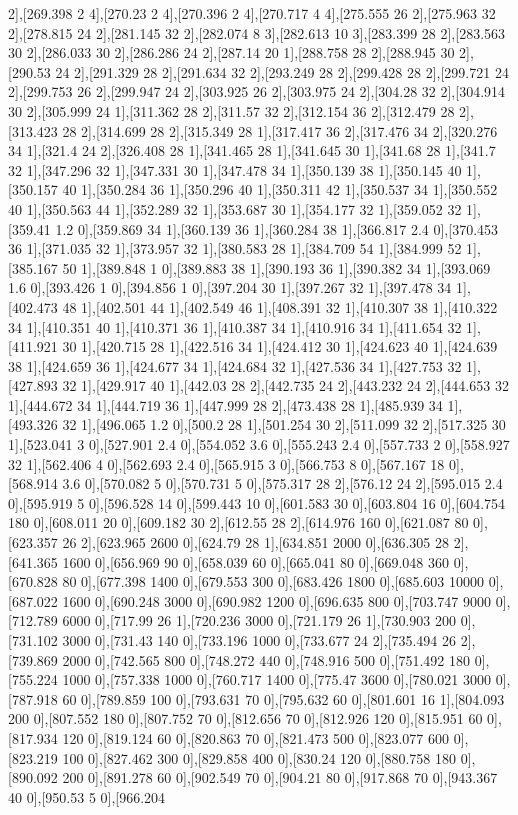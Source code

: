 {2],[269.398 2 4],[270.23 2 4],[270.396 2 4],[270.717 4 4],[275.555 26 2],[275.963 32 2],[278.815 24 2],[281.145 32 2],[282.074 8 3],[282.613 10 3],[283.399 28 2],[283.563 30 2],[286.033 30 2],[286.286 24 2],[287.14 20 1],[288.758 28 2],[288.945 30 2],[290.53 24 2],[291.329 28 2],[291.634 32 2],[293.249 28 2],[299.428 28 2],[299.721 24 2],[299.753 26 2],[299.947 24 2],[303.925 26 2],[303.975 24 2],[304.28 32 2],[304.914 30 2],[305.999 24 1],[311.362 28 2],[311.57 32 2],[312.154 36 2],[312.479 28 2],[313.423 28 2],[314.699 28 2],[315.349 28 1],[317.417 36 2],[317.476 34 2],[320.276 34 1],[321.4 24 2],[326.408 28 1],[341.465 28 1],[341.645 30 1],[341.68 28 1],[341.7 32 1],[347.296 32 1],[347.331 30 1],[347.478 34 1],[350.139 38 1],[350.145 40 1],[350.157 40 1],[350.284 36 1],[350.296 40 1],[350.311 42 1],[350.537 34 1],[350.552 40 1],[350.563 44 1],[352.289 32 1],[353.687 30 1],[354.177 32 1],[359.052 32 1],[359.41 1.2 0],[359.869 34 1],[360.139 36 1],[360.284 38 1],[366.817 2.4 0],[370.453 36 1],[371.035 32 1],[373.957 32 1],[380.583 28 1],[384.709 54 1],[384.999 52 1],[385.167 50 1],[389.848 1 0],[389.883 38 1],[390.193 36 1],[390.382 34 1],[393.069 1.6 0],[393.426 1 0],[394.856 1 0],[397.204 30 1],[397.267 32 1],[397.478 34 1],[402.473 48 1],[402.501 44 1],[402.549 46 1],[408.391 32 1],[410.307 38 1],[410.322 34 1],[410.351 40 1],[410.371 36 1],[410.387 34 1],[410.916 34 1],[411.654 32 1],[411.921 30 1],[420.715 28 1],[422.516 34 1],[424.412 30 1],[424.623 40 1],[424.639 38 1],[424.659 36 1],[424.677 34 1],[424.684 32 1],[427.536 34 1],[427.753 32 1],[427.893 32 1],[429.917 40 1],[442.03 28 2],[442.735 24 2],[443.232 24 2],[444.653 32 1],[444.672 34 1],[444.719 36 1],[447.999 28 2],[473.438 28 1],[485.939 34 1],[493.326 32 1],[496.065 1.2 0],[500.2 28 1],[501.254 30 2],[511.099 32 2],[517.325 30 1],[523.041 3 0],[527.901 2.4 0],[554.052 3.6 0],[555.243 2.4 0],[557.733 2 0],[558.927 32 1],[562.406 4 0],[562.693 2.4 0],[565.915 3 0],[566.753 8 0],[567.167 18 0],[568.914 3.6 0],[570.082 5 0],[570.731 5 0],[575.317 28 2],[576.12 24 2],[595.015 2.4 0],[595.919 5 0],[596.528 14 0],[599.443 10 0],[601.583 30 0],[603.804 16 0],[604.754 180 0],[608.011 20 0],[609.182 30 2],[612.55 28 2],[614.976 160 0],[621.087 80 0],[623.357 26 2],[623.965 2600 0],[624.79 28 1],[634.851 2000 0],[636.305 28 2],[641.365 1600 0],[656.969 90 0],[658.039 60 0],[665.041 80 0],[669.048 360 0],[670.828 80 0],[677.398 1400 0],[679.553 300 0],[683.426 1800 0],[685.603 10000 0],[687.022 1600 0],[690.248 3000 0],[690.982 1200 0],[696.635 800 0],[703.747 9000 0],[712.789 6000 0],[717.99 26 1],[720.236 3000 0],[721.179 26 1],[730.903 200 0],[731.102 3000 0],[731.43 140 0],[733.196 1000 0],[733.677 24 2],[735.494 26 2],[739.869 2000 0],[742.565 800 0],[748.272 440 0],[748.916 500 0],[751.492 180 0],[755.224 1000 0],[757.338 1000 0],[760.717 1400 0],[775.47 3600 0],[780.021 3000 0],[787.918 60 0],[789.859 100 0],[793.631 70 0],[795.632 60 0],[801.601 16 1],[804.093 200 0],[807.552 180 0],[807.752 70 0],[812.656 70 0],[812.926 120 0],[815.951 60 0],[817.934 120 0],[819.124 60 0],[820.863 70 0],[821.473 500 0],[823.077 600 0],[823.219 100 0],[827.462 300 0],[829.858 400 0],[830.24 120 0],[880.758 180 0],[890.092 200 0],[891.278 60 0],[902.549 70 0],[904.21 80 0],[917.868 70 0],[943.367 40 0],[950.53 5 0],[966.204 }
